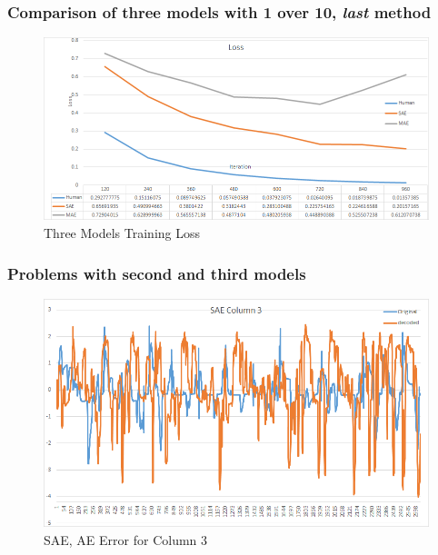 \documentclass{beamer}
\begin{document}
\begin{frame}
\frametitle{Comparison of three models with 1 over 10, {\em last} method}
\begin{figure}[t!]
    \centering
    \includegraphics[width=\textwidth]{../paper/pictures/result_pictures/three_models_comparison_loss.png}
    \caption{Three Models Training Loss}
    \label{fig:three_models_comparison_loss}
\end{figure}
\end{frame}

\begin{frame}
\frametitle{Problems with second and third models}
\begin{figure}[t!]
    \centering
    \includegraphics[width=\textwidth]{../paper/pictures/result_pictures/SAE_Column_3.png}
    \caption{SAE, AE Error for Column 3}
    \label{fig:sae_error_c3}
\end{figure}
\end{frame}
\end{document}
